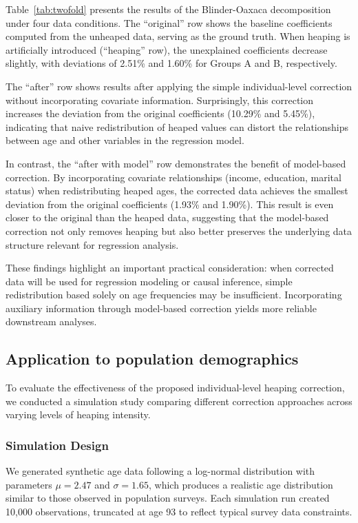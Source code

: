 \documentclass[pdflatex,sn-mathphys-num]{sn-jnl}%
\theoremstyle{thmstyleone}%
\theoremstyle{thmstyletwo}%
\theoremstyle{thmstylethree}%
\begin{document}
Table~\ref{tab:twofold} presents the results of the Blinder-Oaxaca decomposition under four data conditions. The ``original'' row shows the baseline coefficients computed from the unheaped data, serving as the ground truth. When heaping is artificially introduced (``heaping'' row), the unexplained coefficients decrease slightly, with deviations of 2.51\% and 1.60\% for Groups A and B, respectively.

The ``after'' row shows results after applying the simple individual-level correction without incorporating covariate information. Surprisingly, this correction increases the deviation from the original coefficients (10.29\% and 5.45\%), indicating that naive redistribution of heaped values can distort the relationships between age and other variables in the regression model.

In contrast, the ``after with model'' row demonstrates the benefit of model-based correction. By incorporating covariate relationships (income, education, marital status) when redistributing heaped ages, the corrected data achieves the smallest deviation from the original coefficients (1.93\% and 1.90\%). This result is even closer to the original than the heaped data, suggesting that the model-based correction not only removes heaping but also better preserves the underlying data structure relevant for regression analysis.

These findings highlight an important practical consideration: when corrected data will be used for regression modeling or causal inference, simple redistribution based solely on age frequencies may be insufficient. Incorporating auxiliary information through model-based correction yields more reliable downstream analyses.

\subsection{Application to population demographics}

To evaluate the effectiveness of the proposed individual-level heaping correction, we conducted a simulation study comparing different correction approaches across varying levels of heaping intensity.

\subsubsection{Simulation Design}

We generated synthetic age data following a log-normal distribution with parameters $\mu = 2.47$ and $\sigma = 1.65$, which produces a realistic age distribution similar to those observed in population surveys. Each simulation run created 10,000 observations, truncated at age 93 to reflect typical survey data constraints.
\end{document}
